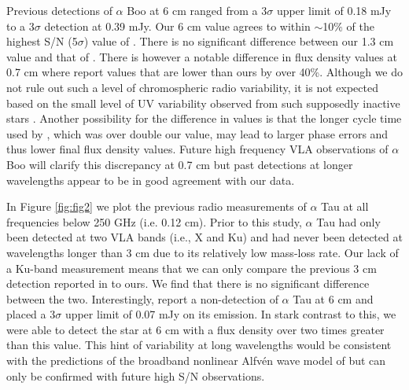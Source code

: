 \documentclass[iop]{emulateapj}
\begin{document}
Previous detections of $\alpha$ Boo at 6 cm ranged from a 3$\sigma$ upper limit of 0.18 mJy to a 3$\sigma$ detection at 0.39 mJy. Our 6 cm value agrees to within $\sim$10$\%$ of the highest S/N (5$\sigma$) value of \cite{1986AJ.....91..602D}. There is no significant difference between our 1.3 cm value and that of \cite{2011AA...533A.107D}. There is however a notable difference in flux density values at 0.7 cm  where \cite{2011AA...533A.107D} report values that are lower than ours by over 40\%. Although we do not rule out such a level of chromospheric radio variability, it is not expected based on the small level of UV variability observed from such supposedly inactive stars \citep{2013MNRAS.428.2064H}. Another possibility for the difference in values is that the longer cycle time used by \cite{2011AA...533A.107D}, which was over double our value, may lead to larger phase errors and thus lower final flux density values. Future high frequency VLA observations of $\alpha$ Boo will clarify this discrepancy at 0.7 cm but past detections at longer wavelengths appear to be in good agreement with our data.

In Figure \ref{fig:fig2} we plot the previous  radio measurements of $\alpha$ Tau at all frequencies below 250 GHz (i.e. 0.12 cm). Prior to this study, $\alpha$ Tau had only been detected at two VLA bands (i.e., X and Ku) and had never been detected at wavelengths longer than 3 cm due to its relatively low mass-loss rate. Our lack of a Ku-band measurement means that we can only compare the previous 3 cm detection reported in \cite{2007ApJ...655..946W} to ours. We find that there is no significant difference between the two. Interestingly, \cite{2007ApJ...655..946W} report a non-detection of $\alpha$ Tau at 6 cm and placed a 3$\sigma$ upper limit of 0.07 mJy on its emission. In stark contrast to this, we were able to detect the star at 6 cm with a flux density over two times greater than this value. This hint of variability at long wavelengths would be consistent with the predictions of the broadband nonlinear Alfv\'{e}n wave model of \cite{2010ApJ...723.1210A} but can only be confirmed with future high S/N observations.
\end{document}
